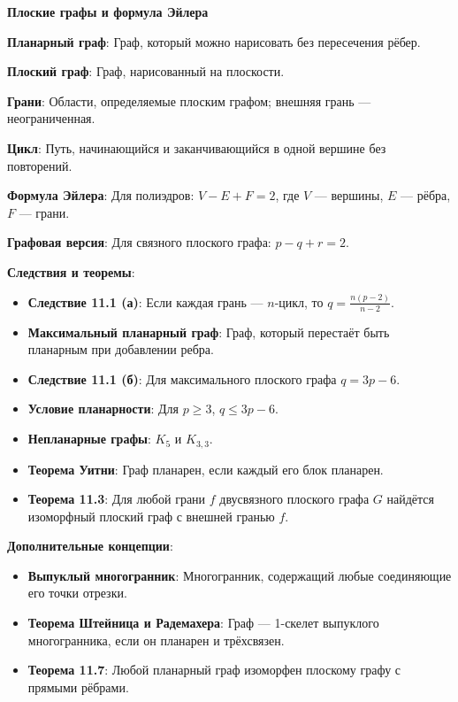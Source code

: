 \textbf{Плоские графы и формула Эйлера}

\noindent\textbf{Планарный граф}: Граф, который можно нарисовать без пересечения рёбер.

\noindent\textbf{Плоский граф}: Граф, нарисованный на плоскости.

\noindent\textbf{Грани}: Области, определяемые плоским графом; внешняя грань — неограниченная.

\noindent\textbf{Цикл}: Путь, начинающийся и заканчивающийся в одной вершине без повторений.

\noindent\textbf{Формула Эйлера}:
Для полиэдров: \( V - E + F = 2 \), где \( V \) — вершины, \( E \) — рёбра, \( F \) — грани.

\noindent\textbf{Графовая версия}:
Для связного плоского графа: \( p - q + r = 2 \).

\noindent\textbf{Следствия и теоремы}:
\begin{itemize}
    \item \textbf{Следствие 11.1 (а)}: Если каждая грань — \( n \)-цикл, то \( q = \frac{n(p-2)}{n-2} \).
    \item \textbf{Максимальный планарный граф}: Граф, который перестаёт быть планарным при добавлении ребра.
    \item \textbf{Следствие 11.1 (б)}: Для максимального плоского графа \( q = 3p - 6 \).
    \item \textbf{Условие планарности}: Для \( p \geq 3 \), \( q \leq 3p - 6 \).
    \item \textbf{Непланарные графы}: \( K_5 \) и \( K_{3,3} \).
    \item \textbf{Теорема Уитни}: Граф планарен, если каждый его блок планарен.
    \item \textbf{Теорема 11.3}: Для любой грани \( f \) двусвязного плоского графа \( G \) найдётся изоморфный плоский граф с внешней гранью \( f \).
\end{itemize}

\noindent\textbf{Дополнительные концепции}:
\begin{itemize}
    \item \textbf{Выпуклый многогранник}: Многогранник, содержащий любые соединяющие его точки отрезки.
    \item \textbf{Теорема Штейница и Радемахера}: Граф — 1-скелет выпуклого многогранника, если он планарен и трёхсвязен.
    \item \textbf{Теорема 11.7}: Любой планарный граф изоморфен плоскому графу с прямыми рёбрами.
\end{itemize}